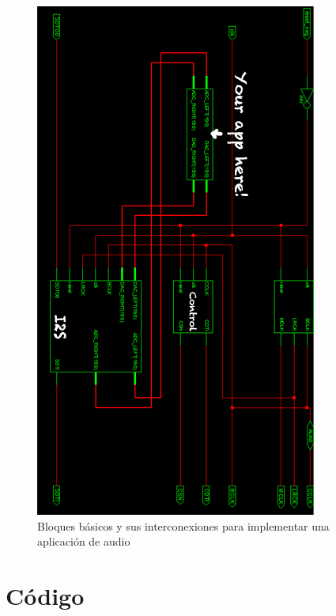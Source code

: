 \begin{figure}[H]
\begin{center}
	\includegraphics{./fig}
\caption{Bloques básicos y sus interconexiones para implementar una aplicación de audio}
\end{center}
\end{figure}
		

		

\section{Código}
